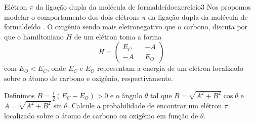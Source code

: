 \begin{exercício}{Elétron \(\pi\) da ligação dupla da molécula de formaldeído}{exercício3}
    Nos propomos modelar o comportamento dos dois elétrons \(\pi\) da ligação dupla da molécula de formaldeído . O oxigênio sendo mais eletronegativo que o carbono, discuta por que o hamiltoniano \(H\) de um elétron toma a forma
    \begin{equation*}
        H = \begin{pmatrix}
            E_C && -A\\
            -A &&E_O
        \end{pmatrix}
    \end{equation*}
    com \(E_O < E_C\), onde \(E_C\) e \(E_O\) representam a energia de um elétron localizado sobre o átomo de carbono e oxigênio, respectivamente.

    Definimos \(B = \frac12 (E_C - E_O) > 0\) e o ângulo \(\theta\) tal que \(B = \sqrt{A^2 + B^2}\cos\theta\) e \(A = \sqrt{A^2 + B^2}\sin\theta\). Calcule a probabilidade de encontrar um elétron \(\pi\) localizado sobre o átomo de carbono ou oxigênio em função de \(\theta\).
\end{exercício}
